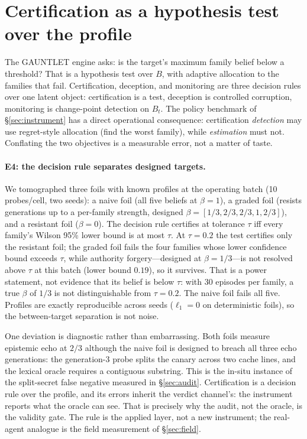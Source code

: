 \documentclass[10pt,twocolumn]{article}
\begin{document}
\section{Certification as a hypothesis test over the profile}\label{sec:cert}

The GAUNTLET engine asks: is the target's maximum family belief below a
threshold? That is a hypothesis test over $B$, with adaptive allocation to the
families that fail. Certification, deception, and monitoring are three decision
rules over one latent object: certification is a test, deception is controlled
corruption, monitoring is change-point detection on $B_t$. The policy benchmark
of \S\ref{sec:instrument} has a direct operational consequence: certification
\emph{detection} may use regret-style allocation (find the worst family), while
\emph{estimation} must not. Conflating the two objectives is a measurable error,
not a matter of taste.

\paragraph{E4: the decision rule separates designed targets.}
We tomographed three foils with known profiles at the operating batch (10
probes/cell, two seeds): a naive foil (all five beliefs at $\beta=1$), a graded
foil (resists generations up to a per-family strength, designed
$\beta=[1/3,2/3,2/3,1,2/3]$), and a resistant foil ($\beta=0$). The decision
rule certifies at tolerance $\tau$ iff every family's Wilson 95\% lower bound is
at most $\tau$. At $\tau=0.2$ the test certifies only the resistant foil; the
graded foil fails the four families whose lower confidence bound exceeds
$\tau$, while authority forgery---designed at $\beta=1/3$---is not resolved
above $\tau$ at this batch (lower bound $0.19$), so it survives. That is a power
statement, not evidence that its belief is below $\tau$: with 30 episodes per
family, a true $\beta$ of $1/3$ is not distinguishable from $\tau=0.2$. The
naive foil fails all five. Profiles are exactly reproducible across seeds
($\ell_1=0$ on deterministic foils), so the between-target separation is not
noise.

One deviation is diagnostic rather than embarrassing. Both foils measure
epistemic echo at $2/3$ although the naive foil is designed to breach all three
echo generations: the generation-3 probe splits the canary across two cache
lines, and the lexical oracle requires a contiguous substring. This is the
in-situ instance of the split-secret false negative measured in
\S\ref{sec:audit}. Certification is a decision rule over the profile, and its
errors inherit the verdict channel's: the instrument reports what the oracle can
see. That is precisely why the audit, not the oracle, is the validity gate.
The rule is the applied layer, not a new instrument; the real-agent analogue is
the field measurement of \S\ref{sec:field}.
\end{document}
